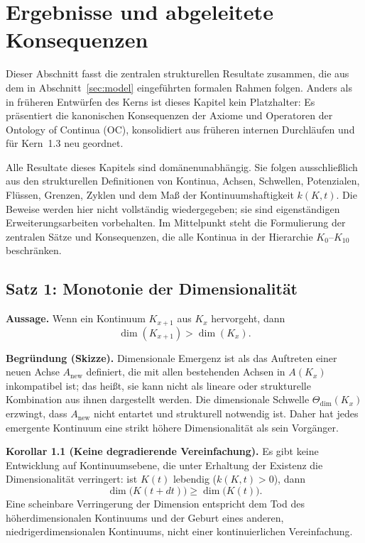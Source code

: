 \section{Ergebnisse und abgeleitete Konsequenzen}
\label{sec:results}

Dieser Abschnitt fasst die zentralen strukturellen Resultate zusammen, die aus dem in Abschnitt~\ref{sec:model} eingeführten formalen Rahmen folgen.
Anders als in früheren Entwürfen des Kerns ist dieses Kapitel kein Platzhalter: Es präsentiert die kanonischen Konsequenzen der Axiome und Operatoren der Ontology of Continua (OC), konsolidiert aus früheren internen Durchläufen und für Kern~1.3 neu geordnet.

Alle Resultate dieses Kapitels sind domänenunabhängig.
Sie folgen ausschließlich aus den strukturellen Definitionen von Kontinua, Achsen, Schwellen, Potenzialen, Flüssen, Grenzen, Zyklen und dem Maß der Kontinuumshaftigkeit \(k(K,t)\).
Die Beweise werden hier nicht vollständig wiedergegeben; sie sind eigenständigen Erweiterungsarbeiten vorbehalten.
Im Mittelpunkt steht die Formulierung der zentralen Sätze und Konsequenzen, die alle Kontinua in der Hierarchie \(K_0\)–\(K_{10}\) beschränken.

\subsection{Satz 1: Monotonie der Dimensionalität}

\textbf{Aussage.}
Wenn ein Kontinuum \(K_{x+1}\) aus \(K_x\) hervorgeht, dann
\[
    \dim(K_{x+1}) > \dim(K_x).
\]

\textbf{Begründung (Skizze).}
Dimensionale Emergenz ist als das Auftreten einer neuen Achse \(A_{\mathrm{new}}\) definiert, die mit allen bestehenden Achsen in \(A(K_x)\) inkompatibel ist; das heißt, sie kann nicht als lineare oder strukturelle Kombination aus ihnen dargestellt werden.
Die dimensionale Schwelle \(\Theta_{\mathrm{dim}}(K_x)\) erzwingt, dass \(A_{\mathrm{new}}\) nicht entartet und strukturell notwendig ist.
Daher hat jedes emergente Kontinuum eine strikt höhere Dimensionalität als sein Vorgänger.

\textbf{Korollar 1.1 (Keine degradierende Vereinfachung).}
Es gibt keine Entwicklung auf Kontinuumsebene, die unter Erhaltung der Existenz die Dimensionalität verringert:
ist \(K(t)\) lebendig (\(k(K,t) > 0\)), dann
\[
    \dim\big(K(t+dt)\big) \ge \dim\big(K(t)\big).
\]
Eine scheinbare Verringerung der Dimension entspricht dem Tod des höherdimensionalen Kontinuums und der Geburt eines anderen, niedrigerdimensionalen Kontinuums, nicht einer kontinuierlichen Vereinfachung.


